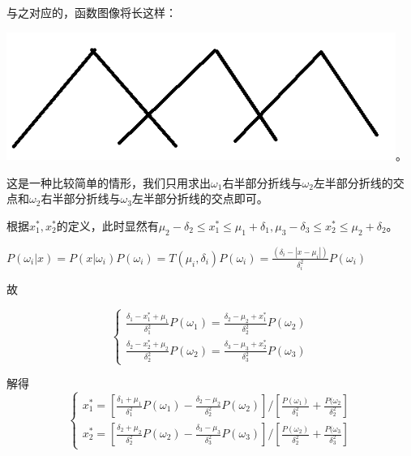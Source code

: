 \documentclass{ctexart}
\begin{document}
与之对应的，函数图像将长这样：

\includegraphics[width=5in]{2.png}。

这是一种比较简单的情形，我们只用求出$\omega_1$右半部分折线与$\omega_2$左半部分折线的交点和$\omega_2$右半部分折线与$\omega_3$左半部分折线的交点即可。

根据$x_1^*,x_2^*$的定义，此时显然有$\mu_2-\delta_2 \le x_1^* \le \mu_1+\delta_1,\mu_3-\delta_3 \le x_2^* \le \mu_2+\delta_2$。

$P(\omega_i|x)=P(x|\omega_i)P(\omega_i)=T(\mu_i,\delta_i)P(\omega_i)=\frac{(\delta_i-|x-\mu_i|)}{\delta_i^2}P(\omega_i)$

故

\[\begin{cases}
\frac{\delta_1-x_1^*+\mu_1}{\delta_1^2}P(\omega_1)=\frac{\delta_2-\mu_2+x_1^*}{\delta_2^2}P(\omega_2) \\
\frac{\delta_2-x_2^*+\mu_2}{\delta_2^2}P(\omega_2)=\frac{\delta_3-\mu_3+x_2^*}{\delta_3^2}P(\omega_3)
\end{cases}\]

解得
\[\begin{cases}
x_1^*=[\frac{\delta_1+\mu_1}{\delta_1^2}P(\omega_1)-\frac{\delta_2-\mu_2}{\delta_2^2}P(\omega_2)]/[\frac{P(\omega_1)}{\delta_1^2}+\frac{P(\omega_2}{\delta_2^2}] \\
x_2^*=[\frac{\delta_2+\mu_2}{\delta_2^2}P(\omega_2)-\frac{\delta_3-\mu_3}{\delta_3^2}P(\omega_3)]/[\frac{P(\omega_2)}{\delta_2^2}+\frac{P(\omega_3}{\delta_3^2}]
\end{cases}\]
\end{document}
